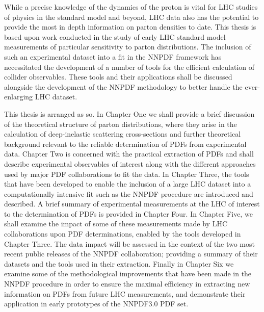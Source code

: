 While a precise knowledge of the dynamics of the proton is vital for LHC studies of physics in the standard model and beyond, LHC data also has the potential to provide the most in depth information on parton densities to date. This thesis is based upon work conducted in the study of early LHC standard model measurements of particular sensitivity to parton distributions. The inclusion of such an experimental dataset into a fit in the NNPDF framework has necessitated the development of a number of tools for the efficient calculation of collider observables. These tools and their applications shall be discussed alongside the development of the NNPDF methodology to better handle the ever-enlarging LHC dataset.

This thesis is arranged as so. In Chapter One we shall provide a brief discussion of the theoretical structure of parton distributions, where they arise in the calculation of deep-inelastic scattering cross-sections and further theoretical background relevant to the reliable determination of PDFs from experimental data. Chapter Two is concerned with the practical extraction of PDFs and shall describe experimental observables of interest along with the different approaches used by major PDF collaborations to fit the data. In Chapter Three, the tools that have been developed to enable the inclusion of a large LHC dataset into a computationally intensive fit such as the NNPDF procedure are introduced and described. A brief summary of experimental measurements at the LHC of interest to the determination of PDFs is provided in Chapter Four. In Chapter Five, we shall examine the impact of some of these measurements made by LHC collaborations upon PDF determinations, enabled by the tools developed in Chapter Three. The data impact will be assessed in the context of the two most recent public releases of the NNPDF collaboration; providing a summary of their datasets and the tools used in their extraction. Finally in Chapter Six we examine some of the methodological improvements that have been made in the NNPDF procedure in order to ensure the maximal efficiency in extracting new information on PDFs from future LHC measurements, and demonstrate their application in early prototypes of the NNPDF3.0 PDF set.


